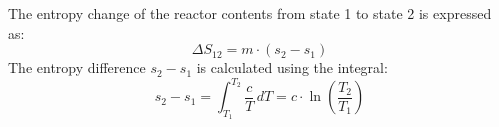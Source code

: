 The entropy change of the reactor contents from state 1 to state 2 is expressed as:  
\[
\Delta S_{12} = m \cdot (s_2 - s_1)
\]  
The entropy difference \( s_2 - s_1 \) is calculated using the integral:  
\[
s_2 - s_1 = \int_{T_1}^{T_2} \frac{c}{T} \, dT = c \cdot \ln \left( \frac{T_2}{T_1} \right)
\]